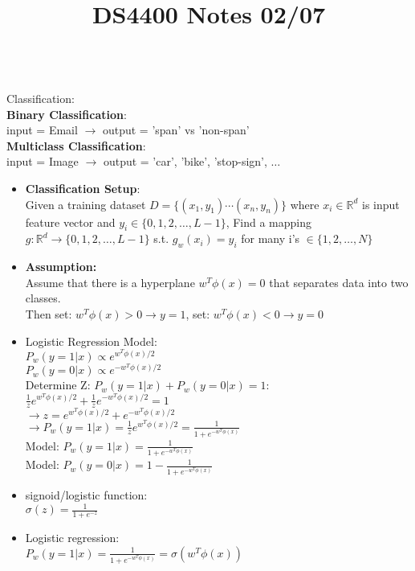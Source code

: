 \documentclass[12pt]{article}
\begin{document}
\begin{multicols}{2}
\begin{enumerate}
        \end{enumerate}
        \title{DS4400 Notes 02/07}
        \maketitle\\
        Classification:\\
        \textbf{Binary Classification}:\\
         input = Email $\rightarrow$ output = 'span' vs 'non-span' \\
        \textbf{Multiclass Classification}:\\
        input = Image $\rightarrow$ output = 'car', 'bike', 'stop-sign', $\dots$\\
        \begin{itemize}
            \item \textbf{Classification Setup}:\\
            Given a training dataset $D=\{(x_1, y_1) \cdots (x_n, y_n)\}$ where $x_i \in \mathbb{R}^d$ is input feature vector and $y_i\in \{0,1,2,\dots, L-1\}$, Find a mapping $g:\mathbb{R}^d \rightarrow \{0,1,2,\dots, L-1\}$ s.t. $g_w(x_i) = y_i$ for many i's $\in \{1,2,\dots, N\}$ 
            \item \textbf{Assumption:}\\
            Assume that there is a hyperplane $w^T\phi(x) =0$ that separates data into two classes. \\
            Then set: $w^T\phi(x) > 0 \rightarrow y = 1$, set: $w^T\phi(x) < 0 \rightarrow y = 0$

            \item Logistic Regression Model:\\
            $P_w(y = 1 | x) \propto e^{w^T\phi(x)/2}$\\
            $P_w(y = 0 | x) \propto e^{-w^T\phi(x)/2}$\\
            Determine Z: $P_w(y = 1 | x) + P_w(y = 0 | x) = 1$:\\
            $\frac{1}{z}e^{w^T\phi(x)/2} + \frac{1}{z} e^{-w^T\phi(x)/2} = 1$\\
            $\rightarrow z = e^{w^T\phi(x)/2} + e^{-w^T\phi(x)/2}$\\
            $\rightarrow P_w(y = 1 | x) = \frac{1}{z}e^{w^T\phi(x)/2} = \frac{1}{1 + e^{-w^T\phi(x)}}$\\

            Model: $P_w(y = 1 | x) = \frac{1}{1 + e^{-w^T\phi(x)}}$\\
            Model: $P_w(y = 0 | x) = 1- \frac{1}{1 + e^{-w^T\phi(x)}}$
            \item signoid/logistic function:\\
            $\sigma(z) = \frac{1}{1 + e^{-z}}$
            \item Logistic regression:\\
            $P_w(y = 1 | x) = \frac{1}{1 + e^{-w^T\phi(x)}} = \sigma(w^T\phi(x))$


\end{itemize}
\end{multicols}
\end{document}
